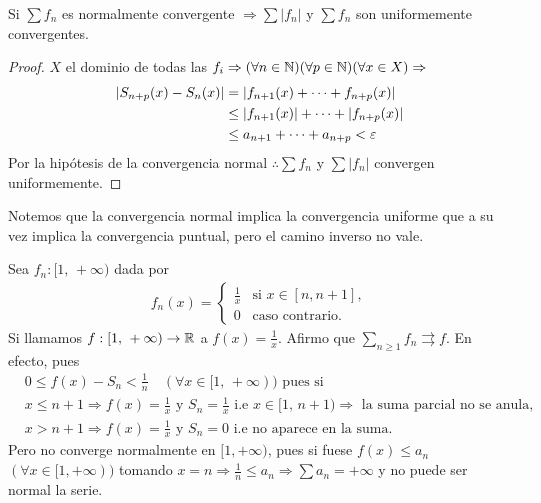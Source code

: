 \begin{theorem}
  Si \(\sum f_n\) es normalmente convergente \(\Rightarrow \sum |f_n|\) y \(\sum f_n\) son uniformemente convergentes.
  \begin{proof}
    \(X\) el dominio de todas las \(f_i \Rightarrow (\forall n \in \mathbb{N})(\forall p \in \mathbb{N})(\forall x \in X) \Rightarrow\) \begin{align*}
      |S_{n + p}(x) - S_n(x)| & = |f_{n+1}(x) + \cdots + f_{n + p}(x)| \\
      & \leq |f_{n+1}(x)| + \cdots + |f_{n+p}(x)| \\
      & \leq a_{n+1} + \cdots + a_{n+p} < \varepsilon
    \end{align*}
    Por la hipótesis de la convergencia normal \(\therefore \sum f_n\) y \(\sum |f_n|\) convergen uniformemente.
  \end{proof}
\end{theorem}

Notemos que la convergencia normal implica la convergencia uniforme que a su vez implica la convergencia puntual, pero el camino inverso no vale.

\begin{eg}
  Sea \(f_n : [1\text{, }+\infty)\) dada por \begin{align*}
    f_n(x) = \begin{cases}
               \frac{1}{x} & \text{si } x \in [n, n+1], \\
               0           & \text{caso contrario.}
             \end{cases}
  \end{align*}
  Si llamamos \(f: [1\text{, } +\infty) \to \mathbb{R}\) a \(f(x) = \frac{1}{x}\).
  Afirmo que \(\sum_{n \geq 1} f_n \rightrightarrows f\). En efecto, pues
  \begin{align*}
     & 0 \leq f(x) - S_n < \frac{1}{n} \quad (\forall x \in [1\text{, } +\infty)) \text{ pues si }                                                                  \\
     & x \leq n+1 \Rightarrow f(x) = \frac{1}{x} \text{ y } S_n = \frac{1}{x} \text{ i.e } x \in [1\text{, } n+1) \Rightarrow \text{ la suma parcial no se anula, } \\
     & x > n+1 \Rightarrow f(x) = \frac{1}{x} \text{ y } S_n = 0 \text{ i.e no aparece en la suma.}
  \end{align*}
  Pero no converge normalmente en \([1, +\infty)\), pues si fuese \(f(x) \leq a_n\) \((\forall x \in [1, +\infty))\) tomando \(x = n \Rightarrow \frac{1}{n} \leq a_n \Rightarrow \sum a_n = +\infty\) y no puede ser normal la serie.
\end{eg}

